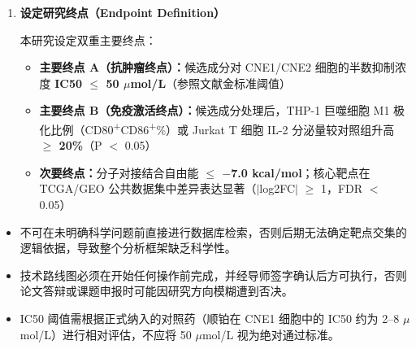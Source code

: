 \documentclass[12pt,a4paper,twoside]{article}
\newcommand{\database}[1]{\textbf{\textsf{#1}}}
\begin{document}
\begin{enumerate}
    \begin{itemize}
      \item \textbf{中药纳入标准（任一满足）：}
        \begin{enumerate}
          \item 收录于《中国药典》2025 版（ChP 2025）且药用部位有效成分数据可查
          \item 已有同行评审文献（PubMed 检索，近 10 年内）报告对【模板替换位：鼻咽癌/目标瘤种】或免疫功能的调节活性
          \item 在 \database{TCMSP}（tcmsp-e.com）中可检索到 $\geq$ 3 种活性成分记录
        \end{enumerate}
      \item \textbf{中药排除标准（任一满足即排除）：}
        \begin{enumerate}
          \item 含有毒性成分（如马兜铃酸、雷公藤碱）且无脱毒处理记录
          \item ChP 2025 未收录且国内临床使用无文献依据
          \item 成分数据库收录成分 $<$ 3 种，无法进行有效网络药理学分析
        \end{enumerate}
      \item \textbf{活性成分纳入标准：}口服生物利用度 \textbf{OB $\geq$ 30\%} 且类药性 \textbf{DL $\geq$ 0.18}（TCMSP 默认金标准阈值 \cite{ru2014tcmsp}）
    \end{itemize}

  \item \textbf{设定研究终点（Endpoint Definition）}

    本研究设定双重主要终点：
    \begin{itemize}
      \item \textbf{主要终点 A（抗肿瘤终点）：}候选成分对 CNE1/CNE2 细胞的半数抑制浓度 \textbf{IC50 $\leq$ 50 $\mu$mol/L}（参照文献金标准阈值）
      \item \textbf{主要终点 B（免疫激活终点）：}候选成分处理后，THP-1 巨噬细胞 M1 极化比例（CD80\textsuperscript{+}CD86\textsuperscript{+}\%）或 Jurkat T 细胞 IL-2 分泌量较对照组升高 \textbf{$\geq$ 20\%}（P $<$ 0.05）
      \item \textbf{次要终点：}分子对接结合自由能 \textbf{$\leq$ $-$7.0 kcal/mol}；核心靶点在 TCGA/GEO 公共数据集中差异表达显著（$|$log2FC$|$ $\geq$ 1，FDR $<$ 0.05）
    \end{itemize}
\end{enumerate}

\begin{warningbox}
\begin{itemize}
  \item 不可在未明确科学问题前直接进行数据库检索，否则后期无法确定靶点交集的逻辑依据，导致整个分析框架缺乏科学性。
  \item 技术路线图必须在开始任何操作前完成，并经导师签字确认后方可执行，否则论文答辩或课题申报时可能因研究方向模糊遭到否决。
  \item IC50 阈值需根据正式纳入的对照药（顺铂在 CNE1 细胞中的 IC50 约为 2--8 $\mu$mol/L）进行相对评估，不应将 50 $\mu$mol/L 视为绝对通过标准。
\end{itemize}
\end{warningbox}
\end{document}
